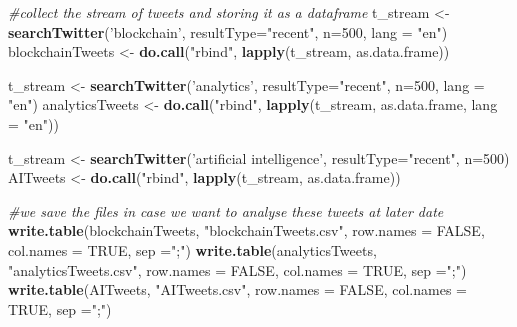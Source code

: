 \documentclass[]{article}
\newenvironment{Shaded}{\begin{snugshade}}{\end{snugshade}}
\newcommand{\KeywordTok}[1]{\textcolor[rgb]{0.13,0.29,0.53}{\textbf{#1}}}
\newcommand{\DataTypeTok}[1]{\textcolor[rgb]{0.13,0.29,0.53}{#1}}
\newcommand{\DecValTok}[1]{\textcolor[rgb]{0.00,0.00,0.81}{#1}}
\newcommand{\StringTok}[1]{\textcolor[rgb]{0.31,0.60,0.02}{#1}}
\newcommand{\CommentTok}[1]{\textcolor[rgb]{0.56,0.35,0.01}{\textit{#1}}}
\newcommand{\OtherTok}[1]{\textcolor[rgb]{0.56,0.35,0.01}{#1}}
\newcommand{\NormalTok}[1]{#1}
\begin{document}
\begin{Shaded}
\begin{Highlighting}[]
\CommentTok{#collect the stream of tweets and storing it as a dataframe}
\NormalTok{t_stream <-}\StringTok{ }\KeywordTok{searchTwitter}\NormalTok{(}\StringTok{'blockchain'}\NormalTok{, }\DataTypeTok{resultType=}\StringTok{"recent"}\NormalTok{, }\DataTypeTok{n=}\DecValTok{500}\NormalTok{, }\DataTypeTok{lang =} \StringTok{"en"}\NormalTok{)}
\NormalTok{blockchainTweets <-}\StringTok{ }\KeywordTok{do.call}\NormalTok{(}\StringTok{"rbind"}\NormalTok{, }\KeywordTok{lapply}\NormalTok{(t_stream, as.data.frame))}

\NormalTok{t_stream <-}\StringTok{ }\KeywordTok{searchTwitter}\NormalTok{(}\StringTok{'analytics'}\NormalTok{, }\DataTypeTok{resultType=}\StringTok{"recent"}\NormalTok{, }\DataTypeTok{n=}\DecValTok{500}\NormalTok{, }\DataTypeTok{lang =} \StringTok{"en"}\NormalTok{)}
\NormalTok{analyticsTweets <-}\StringTok{ }\KeywordTok{do.call}\NormalTok{(}\StringTok{"rbind"}\NormalTok{, }\KeywordTok{lapply}\NormalTok{(t_stream, as.data.frame, }\DataTypeTok{lang =} \StringTok{"en"}\NormalTok{))}

\NormalTok{t_stream <-}\StringTok{ }\KeywordTok{searchTwitter}\NormalTok{(}\StringTok{'artificial intelligence'}\NormalTok{, }\DataTypeTok{resultType=}\StringTok{"recent"}\NormalTok{, }\DataTypeTok{n=}\DecValTok{500}\NormalTok{)}
\NormalTok{AITweets <-}\StringTok{ }\KeywordTok{do.call}\NormalTok{(}\StringTok{"rbind"}\NormalTok{, }\KeywordTok{lapply}\NormalTok{(t_stream, as.data.frame))}


\CommentTok{#we save the files in case we want to analyse these tweets at later date}
\KeywordTok{write.table}\NormalTok{(blockchainTweets, }\StringTok{"blockchainTweets.csv"}\NormalTok{, }\DataTypeTok{row.names =} \OtherTok{FALSE}\NormalTok{, }\DataTypeTok{col.names =} \OtherTok{TRUE}\NormalTok{, }\DataTypeTok{sep =}\StringTok{";"}\NormalTok{)}
\KeywordTok{write.table}\NormalTok{(analyticsTweets, }\StringTok{"analyticsTweets.csv"}\NormalTok{, }\DataTypeTok{row.names =} \OtherTok{FALSE}\NormalTok{, }\DataTypeTok{col.names =} \OtherTok{TRUE}\NormalTok{, }\DataTypeTok{sep =}\StringTok{";"}\NormalTok{)}
\KeywordTok{write.table}\NormalTok{(AITweets, }\StringTok{"AITweets.csv"}\NormalTok{, }\DataTypeTok{row.names =} \OtherTok{FALSE}\NormalTok{, }\DataTypeTok{col.names =} \OtherTok{TRUE}\NormalTok{, }\DataTypeTok{sep =}\StringTok{";"}\NormalTok{)}



\end{Highlighting}
\end{Shaded}
\end{document}
